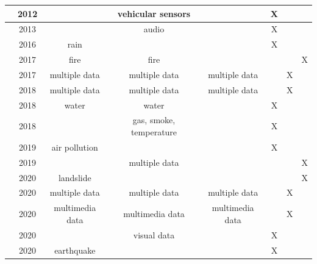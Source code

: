 \begin{refsection}
\begin{table}
\begin{tabular}{|c|c|c|c|c|c|c|c|}
    \hline
    \citeauthor{emergencyTraffic1} \cite{emergencyTraffic1} & 2012 &  & vehicular sensors & & X & & \\
    
    \hline
    \citeauthor{detectionAudio1} \cite{detectionAudio1} & 2013 &  & audio & & X & & \\
    
    \hline
    \citeauthor{iotRain1} \cite{iotRain1} & 2016 & rain &  &  & X & & \\
    
    \hline
    \citeauthor{SultanMahmud2017} \cite{SultanMahmud2017} & 2017 & fire & fire & & & & X \\
    
    \hline
    \citeauthor{iotDetection2} \cite{iotDetection2} & 2017 & multiple data & multiple data & multiple data & & X & \\
    
    \hline
    \citeauthor{iotDetection1} \cite{iotDetection1} & 2018 & multiple data & multiple data & multiple data &  & X & \\
    
    \hline
    \citeauthor{iotFlood1} \cite{iotFlood1} & 2018 & water & water & & X & & \\
    
    \hline
    \citeauthor{iotFire1} \cite{iotFire1} & 2018 &  & gas, smoke, temperature & & X & & \\
    
    \hline
    \citeauthor{iotPollution1} \cite{iotPollution1} & 2019 & air pollution & & & X & & \\
    
    \hline
    \citeauthor{Alkhatib2019771} \cite{Alkhatib2019771} & 2019 & & multiple data & & & & X \\
    
    \hline
    \citeauthor{BRAGAGNOLO2020104240} \cite{BRAGAGNOLO2020104240} & 2020 & landslide & & & & & X \\
    
    \hline
    \citeauthor{emergenciesmetric2} \cite{emergenciesmetric2} & 2020 & multiple data & multiple data &  multiple data &  & X & \\
    
    \hline
    \citeauthor{emergenciesmetric3} \cite{emergenciesmetric3} & 2020 & multimedia data & multimedia data & multimedia data &  & X &\\
    \hline
    
    \citeauthor{iotCovid1} \cite{iotCovid1} & 2020 &  & visual data &  & X & & \\
    \hline
    \citeauthor{iotEarthquake1} \cite{iotEarthquake1} & 2020 & earthquake &  &  & X & & \\
    \hline
    

\end{tabular}
\end{table}
\end{refsection}
